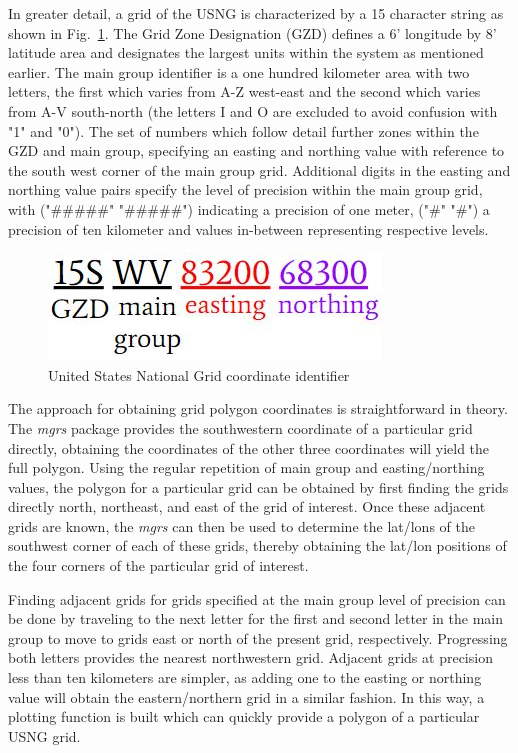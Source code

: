 \documentclass[conference]{IEEEtran}
\begin{document}
In greater detail, a grid of the USNG is characterized by a 15 character string as shown in Fig.~\ref{usngidentifier}. The Grid Zone Designation (GZD) defines a 6' longitude by 8' latitude area and designates the largest units within the system as mentioned earlier. The main group identifier is a one hundred kilometer area with two letters, the first which varies from A-Z west-east and the second which varies from A-V south-north (the letters I and O are excluded to avoid confusion with "1" and "0"). The set of numbers which follow detail further zones within the GZD and main group, specifying an easting and northing value with reference to the south west corner of the main group grid. Additional digits in the easting and northing value pairs specify the level of precision within the main group grid, with ("\#\#\#\#\#" "\#\#\#\#\#") indicating a precision of one meter, ("\#" "\#") a precision of ten kilometer and values in-between representing respective levels. 

\begin{figure}[ht]
\centering\includegraphics[width=0.4\linewidth]{USNGidentifier.JPG}
\caption{United States National Grid coordinate identifier}
\label{usngidentifier}
\end{figure}

The approach for obtaining grid polygon coordinates is straightforward in theory. The \emph{mgrs} package provides the southwestern coordinate of a particular grid directly, obtaining the coordinates of the other three coordinates will yield the full polygon. Using the regular repetition of main group and easting/northing values, the polygon for a particular grid can be obtained by first finding the grids directly north, northeast, and east of the grid of interest. Once these adjacent grids are known, the \emph{mgrs} can then be used to determine the lat/lons of the southwest corner of each of these grids, thereby obtaining the lat/lon positions of the four corners of the particular grid of interest.

Finding adjacent grids for grids specified at the main group level of precision can be done by traveling to the next letter for the first and second letter in the main group to move to grids east or north of the present grid, respectively. Progressing both letters provides the nearest northwestern grid. Adjacent grids at precision less than ten kilometers are simpler, as adding one to the easting or northing value will obtain the eastern/northern grid in a similar fashion. In this way, a plotting function is built which can quickly provide a polygon of a particular USNG grid. 
\end{document}

